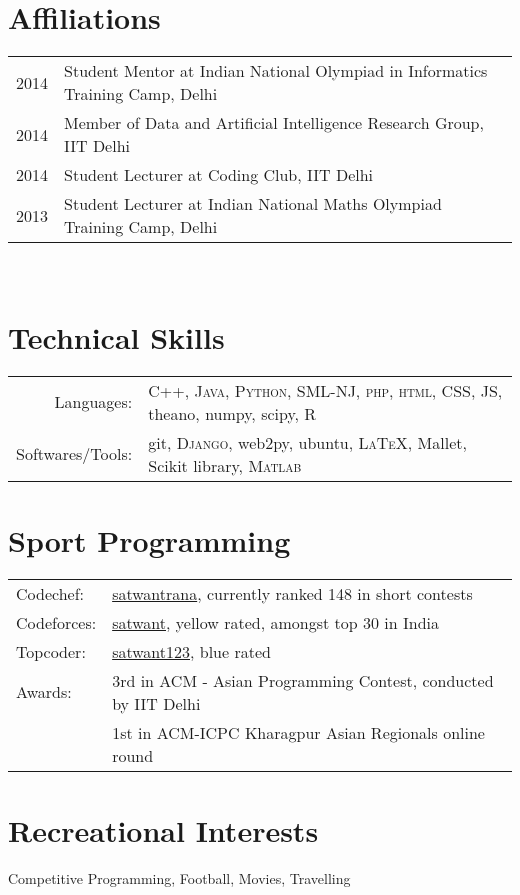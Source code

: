 \documentclass[margin,line]{res}
\begin{document}
\begin{resume}
\section{\sc Affiliations} 
\begin{tabular}{rl}
2014 & Student Mentor at Indian National Olympiad in Informatics Training Camp, Delhi\\
2014 & Member of Data and Artificial Intelligence Research Group, IIT Delhi \\
2014 & Student Lecturer at Coding Club, IIT Delhi\\
2013 & Student Lecturer at Indian National Maths Olympiad Training Camp, Delhi\\
\end{tabular}\\

\section{\sc Technical Skills}

\begin{tabular}{rl}
Languages: & \textsc{C++}, \textsc{Java}, \textsc{Python}, \textsc{SML-NJ}, \textsc{php}, \textsc{html}, \textsc{CSS}, \textsc{JS}, theano, numpy, scipy, R\\

Softwares/Tools: & git, \textsc{Django}, web2py, ubuntu, \textsc{LaTeX}, Mallet, Scikit library,  \textsc{Matlab}\\

\end{tabular}

\section{\sc Sport Programming}

\begin{tabular}{ll}
Codechef: & \href{http://www.codechef.com/users/satwantrana}{satwantrana}, currently ranked 148 in short contests\\
Codeforces: & \href{http://codeforces.com/profile/satwant}{satwant}, yellow rated, amongst top 30 in India\\
Topcoder: & \href{http://community.topcoder.com/tc?module=MemberProfile&cr=23152984}{satwant123}, blue rated\\
Awards: & 3rd in ACM - Asian Programming Contest, conducted by IIT Delhi\\
& 1st in ACM-ICPC Kharagpur Asian Regionals online round

\end{tabular}

\section{\sc Recreational Interests}
Competitive Programming, Football, Movies, Travelling

\end{resume}
\end{document}
